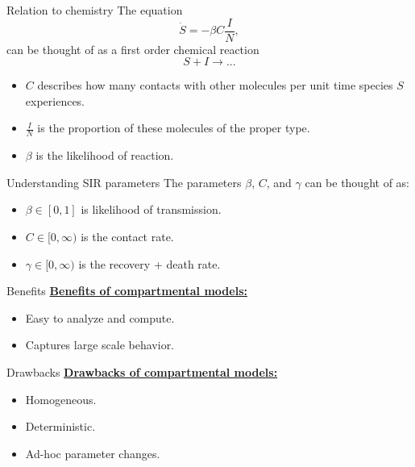 \documentclass[aspectratio=169]{beamer}
\begin{document}
\begin{frame}{Relation to chemistry}
\vfill
    The equation
    \[
    \dot{S} = -\beta C \frac{I}{N},
    \]
    can be thought of as a first order chemical reaction
    \[
    S + I \to ...
    \]
    \pause
    \begin{itemize}  
        \item $C$ describes how many contacts with other molecules per unit time species $S$ experiences.
        \pause
        \item $\frac{I}{N}$ is the proportion of these molecules of the proper type.
        \pause
        \item $\beta$ is the likelihood of reaction.
    \end{itemize}
\vfill    
\end{frame}

\begin{frame}{Understanding SIR parameters}
    \vfill
    \pause
    The parameters $\beta$, $C$, and $\gamma$ can be thought of as:
    \begin{itemize}
    \pause
        \item $\beta \in [0,1]$ is likelihood of transmission.
        \pause
        \item $C \in [0,\infty)$ is the contact rate.
        \pause
        \item $\gamma \in [0,\infty)$ is the recovery + death rate.
    \end{itemize}
    \vfill
\end{frame}

\begin{frame}{Benefits}
    \vfill
    \textbf{\underline{Benefits of compartmental models:}}
    \begin{itemize}
        \pause
        \item Easy to analyze and compute.
        \pause
        \item Captures large scale behavior.
    \end{itemize}
    \vfill
\end{frame}

\begin{frame}{Drawbacks}
    \vfill
    \textbf{\underline{Drawbacks of compartmental models:}}
    \begin{itemize}
        \pause
        \item Homogeneous.
        \pause
        \item Deterministic.
        \pause
        \item Ad-hoc parameter changes.
    \end{itemize}
    \vfill
\end{frame}
\end{document}
